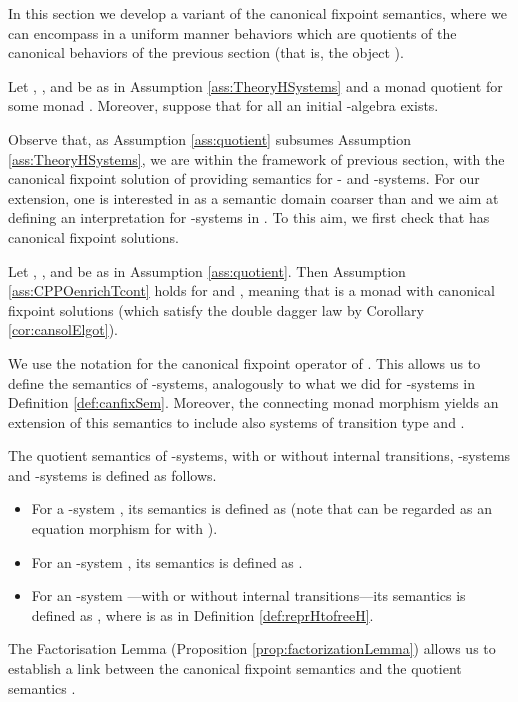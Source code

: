 \documentclass[oribibl,envcountsame,envcountsect,runningheads]{llncs}
\renewcommand{\>}{\rangle}
\begin{document}
In this section we develop a variant of the canonical fixpoint semantics, where we can encompass in a uniform manner behaviors which are quotients of the canonical behaviors of the previous section (that is, the object ).
\begin{assumption}\label{ass:quotient} Let , ,  and  be as in Assumption \ref{ass:TheoryHSystems} and  a monad quotient for some monad . Moreover, suppose that for all  an initial -algebra exists.
\end{assumption}
Observe that, as Assumption \ref{ass:quotient} subsumes Assumption \ref{ass:TheoryHSystems}, we are within the framework of previous section, with the canonical fixpoint solution of  providing semantics for - and -systems. For our extension, one is interested in  as a semantic domain coarser than  and we aim at defining an interpretation for -systems in . To this aim, we first check that  has canonical fixpoint solutions.
\newcommand{\propQElgot}{Let , ,  and  be as in Assumption \ref{ass:quotient}. Then Assumption \ref{ass:CPPOenrichTcont} holds for  and , meaning that  is a monad with canonical fixpoint solutions (which satisfy the double dagger law by Corollary \ref{cor:cansolElgot}).}
\begin{proposition}\label{prop:QElgot}
\propQElgot
\end{proposition}
We use the notation  for the canonical fixpoint operator of . This allows us to define the semantics of -systems, analogously to what we did for -systems in Definition \ref{def:canfixSem}. Moreover, the connecting monad morphism  yields an extension of this semantics to include also systems of transition type  and .
\begin{definition} \label{def:quotSem}
The quotient semantics of -systems, with or without internal transitions, -systems and -systems is defined as follows.
\begin{itemize}
  \item For a -system , its semantics  is defined as  (note that  can be regarded as an equation morphism for  with ).
\item For an -system , its semantics  is defined as .
\item For an -system ---with or without internal transitions---its semantics  is defined as , where  is as in Definition \ref{def:reprHtofreeH}.
\end{itemize}
\end{definition}
The Factorisation Lemma (Proposition \ref{prop:factorizationLemma}) allows us to establish a link between the canonical fixpoint semantics  and the quotient semantics .
\end{document}
